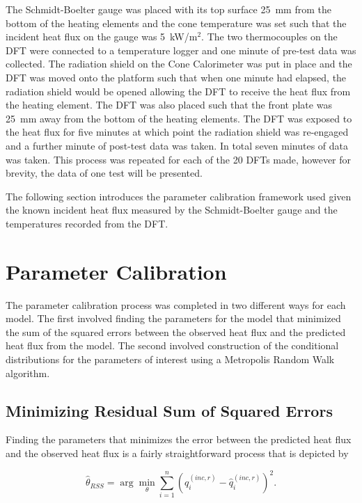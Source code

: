 \documentclass[article]{proc}
\begin{document}
    The Schmidt-Boelter gauge was placed with its top surface 25~mm from the bottom of the heating elements and the cone temperature was set such that the incident heat flux on the gauge was 5~kW/m$^2$. The two thermocouples on the DFT were connected to a temperature logger and one minute of pre-test data was collected. The radiation shield on the Cone Calorimeter was put in place and the DFT was moved onto the platform such that when one minute had elapsed, the radiation shield would be opened allowing the DFT to receive the heat flux from the heating element. The DFT was also placed such that the front plate was 25~mm away from the bottom of the heating elements. The DFT was exposed to the heat flux for five minutes at which point the radiation shield was re-engaged and a further minute of post-test data was taken. In total seven minutes of data was taken. This process was repeated for each of the 20 DFTs made, however for brevity, the data of one test will be presented. 

    The following section introduces the parameter calibration framework used given the known incident heat flux measured by the Schmidt-Boelter gauge and the temperatures recorded from the DFT. 

\section{Parameter Calibration}

    The parameter calibration process was completed in two different ways for each model. The first involved finding the parameters for the model that minimized the sum of the squared errors between the observed heat flux and the predicted heat flux from the model. The second involved construction of the conditional distributions for the parameters of interest using a Metropolis Random Walk algorithm. 

    \subsection{Minimizing Residual Sum of Squared Errors}

        Finding the parameters that minimizes the error between the predicted heat flux and the observed heat flux is a fairly straightforward process that is depicted by

        \begin{equation}\label{eq:rss}
            \hat{\theta}_{RSS} = \arg \min_{\theta}  \sum_{i=1}^n \left(q_i^{(inc,r)} - \hat{q}_i^{(inc,r)} \right)^2.
        \end{equation}
\end{document}

